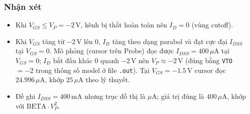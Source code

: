\subsubsection*{Nhận xét}
\begin{remarkbox}
\begin{itemize}[nosep]
  \item Khi $V_{GS} \le V_P = -2\,\text{V}$, kênh bị thắt hoàn toàn nên $I_D = 0$ (vùng cutoff).
  \item Khi $V_{GS}$ tăng từ $-2\,\text{V}$ lên $0$, $I_D$ tăng theo dạng parabol và đạt cực đại $I_{DSS}$ tại $V_{GS} = 0$. Mô phỏng (cursor trên Probe) đọc được $I_{DSS} = 400\,\mu\text{A}$ tại $V_{GS} = 0$; $I_D$ bắt đầu khác $0$ quanh $-2\,\text{V}$ nên $V_P \approx -2\,\text{V}$ (đúng bằng \texttt{VTO} $=-2$ trong thông số model ở file \texttt{.out}). Tại $V_{GS} = -1.5\,\text{V}$ cursor đọc $24.996\,\mu\text{A}$, khớp $25\,\mu\text{A}$ theo lý thuyết.
  \item Đề ghi $I_{DSS} = 400\,\text{mA}$ nhưng trục đồ thị là $\mu$A; giá trị đúng là $400\,\mu\text{A}$, khớp với $\text{BETA}\cdot V_P^2$.
\end{itemize}
\end{remarkbox}
